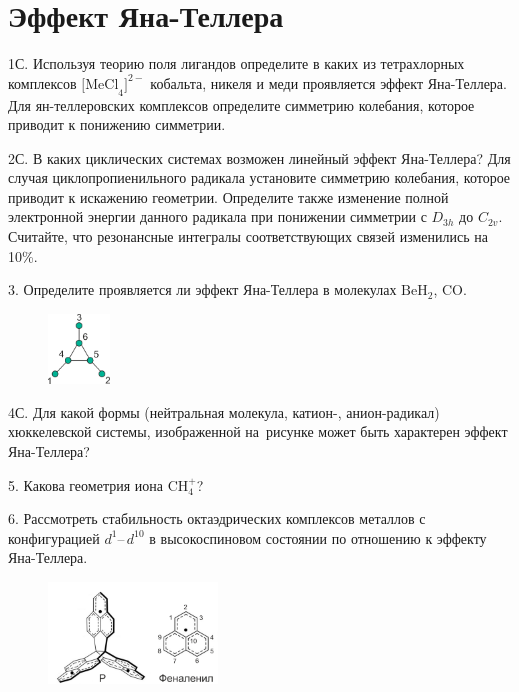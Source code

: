 \setmainfont{Noto Serif}
\setsansfont{Noto Sans}
\setmonofont{Noto Sans Mono}

\section{Эффект Яна-Теллера}
1С. Используя теорию поля лигандов определите в каких из тетрахлорных комплексов $\text{[MeCl}_4]^{2-}$ кобальта, никеля и меди проявляется эффект Яна-Теллера. Для ян-теллеровских комплексов определите симметрию колебания, которое приводит к понижению симметрии.
\par
2С. В каких циклических системах возможен линейный эффект Яна-Теллера? Для случая циклопропиенильного радикала установите симметрию колебания, которое приводит к искажению геометрии. Определите также изменение полной электронной энергии данного радикала при понижении симметрии с $D_{3h}$ до $C_{2v}$. Считайте, что резонансные интегралы соответствующих связей изменились на 10\%.
\par
3. Определите проявляется ли эффект Яна-Теллера в молекулах $\text{BeH}_2$, $\text{CO}$.
\par
\begin{figure} %
    \centering
    \vspace{-2.6ex}
    \includegraphics[width=16.5mm]{images/Fig_2_5_4.png}
    \vspace{-5ex}
\end{figure}
4С. Для какой формы (нейтральная молекула, катион-, анион-радикал) хюккелевской системы, изображенной на~рисунке может быть характерен эффект Яна-Теллера?
\par
5. Какова геометрия иона $\text{CH}_4^+$?
\par
6. Рассмотреть стабильность октаэдрических комплексов металлов с конфигурацией $d^1$–\,$d^{10}$ в высокоспиновом состоянии по отношению к эффекту Яна-Теллера.
\par
\begin{figure} %
    \centering
    \vspace{-4mm}
    \includegraphics[width=45mm]{images/Fig_2_5_7.png}
    \vspace{-6mm}
\end{figure}

